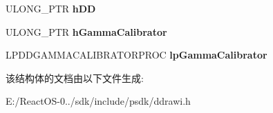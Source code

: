 \begin{DoxyCompactItemize}
U\+L\+O\+N\+G\+\_\+\+P\+TR {\bfseries h\+DD}
\item 
\mbox{\label{struct___d_d_r_a_w_i___d_i_r_e_c_t_d_r_a_w___l_c_l_a46bceba5fcb7ff4218cc226bea24f8eb}} 
U\+L\+O\+N\+G\+\_\+\+P\+TR {\bfseries h\+Gamma\+Calibrator}
\item 
\mbox{\label{struct___d_d_r_a_w_i___d_i_r_e_c_t_d_r_a_w___l_c_l_a0aa9a2f51bf7cb59b68ba40b003e6c9d}} 
L\+P\+D\+D\+G\+A\+M\+M\+A\+C\+A\+L\+I\+B\+R\+A\+T\+O\+R\+P\+R\+OC {\bfseries lp\+Gamma\+Calibrator}
\end{DoxyCompactItemize}


该结构体的文档由以下文件生成\+:\begin{DoxyCompactItemize}
\item 
E\+:/\+React\+O\+S-\/0../sdk/include/psdk/ddrawi.\+h\end{DoxyCompactItemize}
